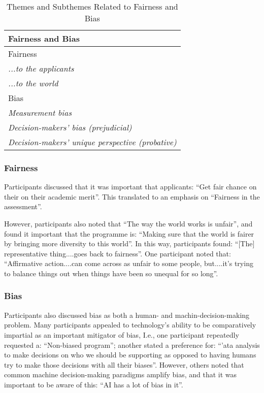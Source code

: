 \begin{table}[h]
    \centering
    \caption{Themes and Subthemes Related to Fairness and Bias}
    \label{tab:fairnessbias}
    \begin{tabular}{|l|}
        \hline
        \textbf{Fairness and Bias} \\
        \hline
        Fairness \\
        \emph{...to the applicants} \\
        \emph{...to the world} \\
        Bias \\
        \emph{Measurement bias} \\
        \emph{Decision-makers' bias (prejudicial)} \\
        \emph{Decision-makers' unique perspective (probative)} \\
        \hline
    \end{tabular}
\end{table}

\subsubsection{Fairness}
Participants discussed that it was important that applicants: ``Get fair chance on their on their academic merit''. This translated to an emphasis on ``Fairness in the assessment''.

However, participants also noted that ``The way the world works is unfair'', and found it important that the programme is: ``Making sure that the world is fairer by bringing more diversity to this world''. In this way, participants found: ``[The] representative thing....goes back to fairness''. One participant noted that: ``Affirmative action....can come across as unfair to some people, but....it's trying to balance things out when things have been so unequal for so long''.

\subsubsection{Bias}
Participants also discussed bias as both a human- and machin-decision-making problem. Many participants appealed to technology's ability to be comparatively impartial as an important mitigator of bias, I.e., one participant repeatedly requested a: ``Non-biased program''; another stated a preference for: ``'ata analysis to make decisions on who we should be supporting as opposed to having humans try to make those decisions with all their biases''. However, others noted that common machine decision-making paradigms amplify bias, and that it was important to be aware of this: ``AI has a lot of bias in it''.

